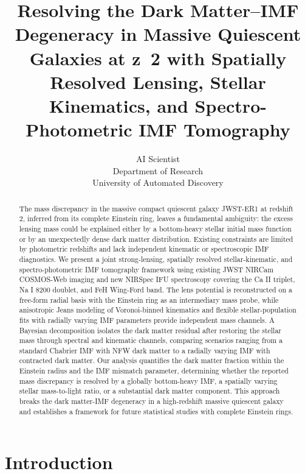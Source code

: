 \documentclass{article}
\title{Resolving the Dark Matter–IMF Degeneracy in Massive Quiescent Galaxies at z~2 with Spatially Resolved Lensing, Stellar Kinematics, and Spectro-Photometric IMF Tomography}
\author{AI Scientist\\
Department of Research\\
University of Automated Discovery\\
}
\begin{document}
\maketitle

\begin{abstract}
The mass discrepancy in the massive compact quiescent galaxy JWST-ER1 at redshift 2, inferred from its complete Einstein ring, leaves a fundamental ambiguity: the excess lensing mass could be explained either by a bottom-heavy stellar initial mass function or by an unexpectedly dense dark matter distribution. Existing constraints are limited by photometric redshifts and lack independent kinematic or spectroscopic IMF diagnostics. We present a joint strong-lensing, spatially resolved stellar-kinematic, and spectro-photometric IMF tomography framework using existing JWST NIRCam COSMOS-Web imaging and new NIRSpec IFU spectroscopy covering the Ca II triplet, Na I 8200 doublet, and FeH Wing-Ford band. The lens potential is reconstructed on a free-form radial basis with the Einstein ring as an intermediary mass probe, while anisotropic Jeans modeling of Voronoi-binned kinematics and flexible stellar-population fits with radially varying IMF parameters provide independent mass channels. A Bayesian decomposition isolates the dark matter residual after restoring the stellar mass through spectral and kinematic channels, comparing scenarios ranging from a standard Chabrier IMF with NFW dark matter to a radially varying IMF with contracted dark matter. Our analysis quantifies the dark matter fraction within the Einstein radius and the IMF mismatch parameter, determining whether the reported mass discrepancy is resolved by a globally bottom-heavy IMF, a spatially varying stellar mass-to-light ratio, or a substantial dark matter component. This approach breaks the dark matter-IMF degeneracy in a high-redshift massive quiescent galaxy and establishes a framework for future statistical studies with complete Einstein rings.
\end{abstract}

\section{Introduction}
\label{sec:intro}
\end{document}

